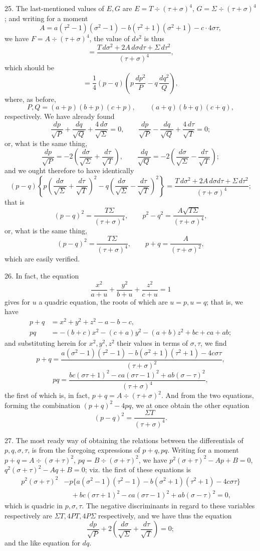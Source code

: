 \documentclass[11pt,a4paper]{article}
\begin{document}
25. The last-mentioned values of $E,G$ are $E=T\div(\tau+\sigma)^4$,
$G=\Sigma\div(\tau+\sigma)^4$; and writing for a moment
\[
 A=a(\tau^2-1)(\sigma^2-1)-b(\tau^2+1)(\sigma^2+1)-c\cdot4\sigma\tau,
\]
we have $F=A\div(\tau+\sigma)^4$, the value of $ds^2$ is thus
\[
 =\frac{T\,d\sigma^2+2A\,d\sigma d\tau+\Sigma\,d\tau^2}{(\tau+\sigma)^4},
\]
which should be
\[
 =\frac14(p-q)\left(p\,\frac{dp^2}{P}-q\,\frac{dq^2}{Q}\right),
\]
where, as before,
\[
 P,Q=(a+p)(b+p)(c+p),\qquad (a+q)(b+q)(c+q),
\]
respectively. We have already found
\[
 \frac{dp}{\sqrt P}+\frac{dq}{\sqrt Q}+\frac{4\,d\sigma}{\sqrt\Sigma}=0,\qquad
 \frac{dp}{\sqrt P}-\frac{dq}{\sqrt Q}+\frac{4\,d\tau}{\sqrt T}=0;
\]
or, what is the same thing,
\[
 \frac{dp}{\sqrt P}=-2\left(\frac{d\sigma}{\sqrt\Sigma}+\frac{d\tau}{\sqrt T}\right),
 \qquad
 \frac{dq}{\sqrt Q}=-2\left(\frac{d\sigma}{\sqrt\Sigma}-\frac{d\tau}{\sqrt T}\right);
\]
and we ought therefore to have identically
\[
 (p-q)\left\{p\left(\frac{d\sigma}{\sqrt\Sigma}+\frac{d\tau}{\sqrt T}\right)^2
 -q\left(\frac{d\sigma}{\sqrt\Sigma}-\frac{d\tau}{\sqrt T}\right)^2\right\}
 =\frac{T\,d\sigma^2+2A\,d\sigma d\tau+\Sigma\,d\tau^2}{(\tau+\sigma)^4};
\]
that is
\[
 (p-q)^2=\frac{T\Sigma}{(\tau+\sigma)^4},\qquad
 p^2-q^2=\frac{A\sqrt{T\Sigma}}{(\tau+\sigma)^4},
\]
or, what is the same thing,
\[
 (p-q)^2=\frac{T\Sigma}{(\tau+\sigma)^4},\qquad
 p+q=\frac{A}{(\tau+\sigma)^2},
\]
which are easily verified.

26. In fact, the equation
\[
 \frac{x^2}{a+u}+\frac{y^2}{b+u}+\frac{z^2}{c+u}=1
\]
gives for $u$ a quadric equation, the roots of which are $u=p,u=q$; that is, we have
\[
\begin{aligned}
 p+q&=x^2+y^2+z^2-a-b-c,\\
 pq&=-(b+c)x^2-(c+a)y^2-(a+b)z^2+bc+ca+ab;
\end{aligned}
\]
and substituting herein for $x^2,y^2,z^2$ their values in terms of $\sigma,\tau$, we find
\[
 p+q=\frac{a(\sigma^2-1)(\tau^2-1)-b(\sigma^2+1)(\tau^2+1)-4c\sigma\tau}{(\tau+\sigma)^2},
\]
\[
 pq=\frac{bc(\sigma\tau+1)^2-ca(\sigma\tau-1)^2+ab(\sigma-\tau)^2}{(\tau+\sigma)^4},
\]
the first of which is, in fact, $p+q=A\div(\tau+\sigma)^2$. And from the two equations,
forming the combination $(p+q)^2-4pq$, we at once obtain the other equation
\[
 (p-q)^2=\frac{\Sigma T}{(\tau+\sigma)^4}.
\]

27. The most ready way of obtaining the relations between the differentials of
$p,q,\sigma,\tau$, is from the foregoing expressions of $p+q,pq$. Writing for a moment
$p+q=A\div(\sigma+\tau)^2$, $pq=B\div(\sigma+\tau)^2$, we have
$p^2(\sigma+\tau)^2-Ap+B=0$, $q^2(\sigma+\tau)^2-Aq+B=0$; viz. the first of these equations is
\[
\begin{aligned}
 p^2(\sigma+\tau)^2
 &-p\{a(\sigma^2-1)(\tau^2-1)-b(\sigma^2+1)(\tau^2+1)-4c\sigma\tau\}\\
 &\quad+bc(\sigma\tau+1)^2-ca(\sigma\tau-1)^2+ab(\sigma-\tau)^2=0,
\end{aligned}
\]
which is quadric in $p,\sigma,\tau$. The negative discriminants in regard to these variables
respectively are $\Sigma T,4PT,4P\Sigma$ respectively, and we have thus the equation
\[
 \frac{dp}{\sqrt P}+2\left(\frac{d\sigma}{\sqrt\Sigma}+\frac{d\tau}{\sqrt T}\right)=0;
\]
and the like equation for $dq$.
\end{document}
